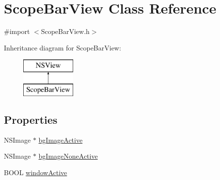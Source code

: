 \hypertarget{interface_scope_bar_view}{\section{Scope\-Bar\-View Class Reference}
\label{interface_scope_bar_view}
}


{\ttfamily \#import $<$Scope\-Bar\-View.\-h$>$}

Inheritance diagram for Scope\-Bar\-View\-:\begin{figure}[H]
\begin{center}
\leavevmode
\includegraphics[height=2.000000cm]{interface_scope_bar_view}
\end{center}
\end{figure}
\subsection*{Properties}
\begin{DoxyCompactItemize}
\item 
N\-S\-Image $\ast$ \hyperlink{interface_scope_bar_view_afdbaea23155cd6f01256782526b67731}{bg\-Image\-Active}
\item 
N\-S\-Image $\ast$ \hyperlink{interface_scope_bar_view_aa8318ae34c4eeeede8e75b2c2ac467d3}{bg\-Image\-None\-Active}
\item 
B\-O\-O\-L \hyperlink{interface_scope_bar_view_aa5330c688cea62c644ac5eb9ee4b0443}{window\-Active}
\end{DoxyCompactItemize}


